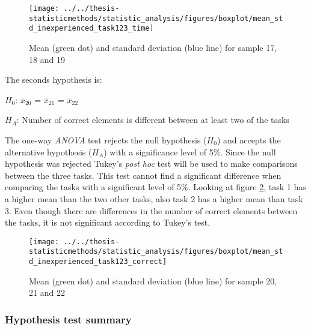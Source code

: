 \begin{figure}[H]
	\centering
	\texttt{[image: ../../thesis-statisticmethods/statistic\_analysis/figures/boxplot/mean\_std\_inexperienced\_task123\_time]}
	\caption{Mean (green dot) and standard deviation (blue line) for sample 17, 18 and 19}
	\label{fig:meanstdinexperiencedtask123time}
\end{figure}

The seconds hypothesis is:\\
\centerline{$H_{0}$: $\overline{x}_{20}$ = $\overline{x}_{21}$ = $\overline{x}_{22}$}
\centerline{$H_{A}$: Number of correct elements is different between at least two of the tasks}

The one-way \textit{ANOVA} test rejects the null hypothesis ($H_0$) and accepts the alternative hypothesis ($H_{A}$) with a significance level of 5\%. Since the null hypothesis was rejected Tukey's \textit{post hoc} test will be used to make comparisons between the three tasks. This test cannot find a significant difference when comparing the tasks with a significant level of 5\%. Looking at figure \ref{fig:meanstdinexperiencedtask123correct}, task 1 has a higher mean than the two other tasks, also task 2 has a higher mean than task 3. Even though there are differences in the number of correct elements between the tasks, it is not significant according to Tukey's test. 

\begin{figure}[H]
	\centering
	\texttt{[image: ../../thesis-statisticmethods/statistic\_analysis/figures/boxplot/mean\_std\_inexperienced\_task123\_correct]}
	\caption{Mean (green dot) and standard deviation (blue line) for sample 20, 21 and 22}
	\label{fig:meanstdinexperiencedtask123correct}
\end{figure}


\subsubsection{Hypothesis test summary}

